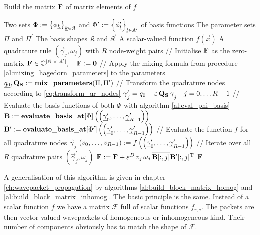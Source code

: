 \begin{algorithm}
\caption{Build the matrix $\mathbf{F}$ of matrix elements of $f$}
\label{al:build_matrix}
\begin{algorithmic}
  \REQUIRE Two sets $\Phi := \left\{\phi_{\underline{k}}\right\}_{\underline{k}\in\mathfrak{K}}$ and
                    $\Phi^\prime := \left\{\phi^\prime_{\underline{l}}\right\}_{\underline{l}\in\mathfrak{K}^\prime}$ of basis functions
  \REQUIRE The parameter sets  $\Pi$ and $\Pi^\prime$
  \REQUIRE The basis shapes $\mathfrak{K}$ and $\mathfrak{K}^\prime$
  \REQUIRE A scalar-valued function $f(\vec{x})$
  \REQUIRE A quadrature rule $(\vec{\gamma}_j, \omega_j)$ with $R$ node-weight pairs
  \STATE // Initialise $\mathbf{F}$ as the zero-matrix
  \STATE $\mathbf{F} \in \mathbb{C}^{|\mathfrak{K}| \times |\mathfrak{K}^\prime|}, \quad \mathbf{F} := \mathbf{0}$
  \STATE // Apply the mixing formula from procedure \ref{al:mixing_hagedorn_parameters} to the parameters
  \STATE $\underline{q_0}, \mathbf{Q_S} := \mathbf{mix\_parameters}(\Pi, \Pi^\prime)$
  \STATE // Transform the quadrature nodes according to \eqref{eq:transform_qr_nodes}
  \STATE $\underline{\gamma}_j^\prime = \underline{q_0} + \varepsilon \, \mathbf{Q_S} \, \underline{\gamma}_j \quad j = 0, \ldots R-1$
  \STATE // Evaluate the basis functions of both $\Phi$ with algorithm \ref{al:eval_phi_basis}
  \STATE $\mathbf{B} := \mathbf{evaluate\_basis\_at}[\Phi]\left(\left(\underline{\gamma}_0^\prime, \ldots, \underline{\gamma}_{R-1}^\prime\right)\right)$
  \STATE $\mathbf{B^\prime} := \mathbf{evaluate\_basis\_at}[\Phi^\prime]\left(\left(\underline{\gamma}_0^\prime, \ldots, \underline{\gamma}_{R-1}^\prime\right)\right)$
  \STATE // Evaluate the function $f$ for all quadrature nodes $\vec{\gamma}_j$
  \STATE $\left(v_0, \ldots, v_{R-1}\right) := f\left( \left(\underline{\gamma}_0^\prime, \ldots, \underline{\gamma}_{R-1}^\prime\right) \right)$
  \STATE // Iterate over all $R$ quadrature pairs $\left(\vec{\gamma}^\prime_j, \omega_j\right)$
    \STATE $\mathbf{F} := \mathbf{F} + \varepsilon^D \, v_{j} \, \omega_j \, \overline{\mathbf{B}[:,j]} \mathbf{B^\prime}[:,j]{}^{\textnormal{T}}$
  \ENDFOR
  \RETURN $\mathbf{F}$
\end{algorithmic}
\end{algorithm}

A generalisation of this algorithm is given in chapter \ref{ch:wavepacket_propagation} by algorithms
\ref{al:build_block_matrix_homog} and \ref{al:build_block_matrix_inhomog}. The basic principle is the
same. Instead of a scalar function $f$ we have a matrix $\mathcal{F}$ full of scalar functions $f_{r,c}$.
The packets are then vector-valued wavepackets of homogeneous or inhomogeneous kind. Their number
of components obviously has to match the shape of $\mathcal{F}$.


